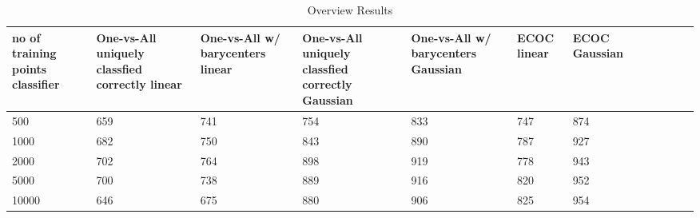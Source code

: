 \begin{table}[ht!]
	\centering
	\caption{Overview Results}
	\begin{tabular}{|l|l|l|l|l|l|l|l|l|l|l|l|} \hline
\multicolumn{1}{|p{2cm}|}{no of training points classifier} & \multicolumn{1}{p{2cm}|}{One-vs-All uniquely classfied correctly linear} & \multicolumn{1}{p{2cm}|}{One-vs-All w/ barycenters linear} & \multicolumn{1}{p{2cm}|}{One-vs-All uniquely classfied correctly Gaussian} &  \multicolumn{1}{p{2cm}|}{One-vs-All w/ barycenters Gaussian} & \multicolumn{1}{p{2cm}|}{ECOC linear} & \multicolumn{1}{p{2cm}|}{ECOC Gaussian} \\ \hline \hline
	500	& 659 & 741 & 754 & 833 & 747 & 874 \\ \hline
	1000	& 682 & 750 & 843 & 890 & 787 & 927 \\ \hline
	2000	& 702 & 764 & 898 & 919 & 778 & 943 \\ \hline
	5000	& 700 & 738 & 889 & 916 & 820 & 952 \\ \hline
	10000	& 646 & 675 & 880 & 906 & 825 & 954 \\ \hline
	\end{tabular}
\end{table}

